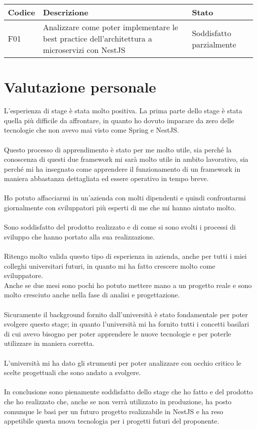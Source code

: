 \leavevmode\newline
\begin{table}
    \begin{tabular}{|p{1.5cm}|p{7.7cm}|p{2cm}|} 
    \hline
    Codice & Descrizione  & Stato \\ 
    \hline
    F01 & Analizzare come poter implementare le best practice dell'architettura a microservizi con NestJS & Soddisfatto parzialmente \\
    \hline
    \end{tabular}
\end{table}

\section{Valutazione personale}
L'esperienza di stage è stata molto positiva. La prima parte dello stage è stata quella più difficile da affrontare, 
in quanto ho dovuto imparare da zero delle tecnologie che non avevo mai visto come Spring e NestJS.
\\\\
Questo processo di apprendimento è stato per me molto utile, sia perché la conoscenza di questi due framework mi sarà molto
utile in ambito lavorativo, sia perché mi ha insegnato come apprendere il funzionamento di un framework in maniera abbastanza
dettagliata ed essere operativo in tempo breve.
\\\\
Ho potuto affacciarmi in un'azienda con molti dipendenti e quindi confrontarmi giornalmente con sviluppatori più esperti di me che mi hanno
aiutato molto.
\\\\
Sono soddisfatto del prodotto realizzato e di come si sono svolti i processi di sviluppo che hanno portato alla sua realizzazione. 
\\\\
Ritengo molto valida questo tipo di esperienza in azienda, anche per tutti i miei colleghi universitari futuri, in quanto mi ha 
fatto crescere molto come sviluppatore. 
\\
Anche se due mesi sono pochi ho potuto mettere mano a un progetto reale e sono molto cresciuto anche nella fase di analisi e progettazione.
\\\\
Sicuramente il background fornito dall'università è stato fondamentale per poter svolgere questo stage; in quanto l'università mi ha 
fornito tutti i concetti basilari di cui avevo bisogno per poter apprendere le nuove tecnologie e per poterle utilizzare in maniera 
corretta.
\\\\
L'università mi ha dato gli strumenti per poter analizzare con occhio critico le scelte progettuali che sono andato a svolgere.
\\\\
In conclusione sono pienamente soddisfatto dello stage che ho fatto e del prodotto che ho realizzato che, anche se non verrà 
utilizzato in produzione, ha posto comunque le basi per un futuro progetto realizzabile in NestJS e ha reso appetibile questa nuova tecnologia
per i progetti futuri del proponente.